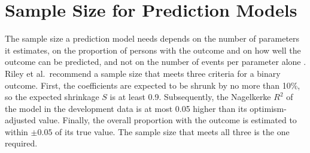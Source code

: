 \section{Sample Size for Prediction Models}
\label{sec:tech-sample-size}

The sample size a prediction model needs depends on the number of parameters it estimates, on the proportion of persons with the outcome and on how well the outcome can be predicted, and not on the number of events per parameter alone \cite{riley2020samplesize}.
Riley et al.\ recommend a sample size that meets three criteria for a binary outcome.
First, the coefficients are expected to be shrunk by no more than 10\%, so the expected shrinkage $S$ is at least 0.9.
Subsequently, the Nagelkerke $R^2$ of the model in the development data is at most 0.05 higher than its optimism-adjusted value.
Finally, the overall proportion with the outcome is estimated to within $\pm 0.05$ of its true value.
The sample size that meets all three is the one required.

